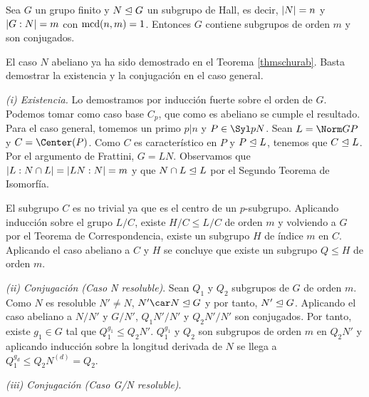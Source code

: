 
\begin{teorema} Sea $G$ un grupo finito y $N\trianglelefteq G$ un subgrupo de Hall, es decir, $\vert N\vert=n$ y $\vert G:N\vert=m$ con $\mathop{\rm mcd}\nolimits(n,m)=1$. Entonces $G$ contiene subgrupos de orden $m$ y son conjugados. %
	\begin{demostracion}
		El caso $N$ abeliano ya ha sido demostrado en el Teorema \ref{thmschurab}. Basta demostrar la existencia y la conjugación en el caso general.
		
		\textit{(i) Existencia.} Lo demostramos por inducción fuerte sobre el orden de $G$. 
		Podemos tomar como caso base $C_p$, que como es abeliano se cumple el resultado. 
		Para el caso general, tomemos un primo $p \big| n$ y $P\in \Syl p N$. Sean $L=\Norm G P$ y $C=\Center(P)$.
		Como $C$ es característico en $P$ y $P\trianglelefteq L$, tenemos que $C\trianglelefteq L$.
		Por el argumento de Frattini, $G=LN$.
		Observamos que $\vert L:N\cap L\vert = \vert LN:N\vert = m$ y que $N\cap L \trianglelefteq L$ por el Segundo Teorema de Isomorfía.
		
		El subgrupo $C$ es no trivial ya que es el centro de un $p$-subgrupo. Aplicando inducción sobre el grupo $L/C$, existe $H/C\leq L/C$ de orden $m$ y volviendo a $G$ por el Teorema de Correspondencia, existe un subgrupo $H$ de índice $m$ en $C$. Aplicando el caso abeliano a $C$ y $H$ se concluye que existe un subgrupo $Q\leq H$ de orden $m$.
%				
%				
%				
%	
		
		\textit{(ii) Conjugación (Caso N resoluble)}. Sean $Q_1$ y $Q_2$ subgrupos de $G$ de orden $m$. Como $N$ es resoluble $N'\neq N$, $N'\car N\norm G$ y por tanto, $N'\trianglelefteq G$. Aplicando el caso abeliano a $N/N'$ y $G/N'$, $Q_1N'/N'$ y $Q_2N'/N'$ son conjugados. Por tanto, existe $g_1\in G$ tal que $Q_1^{g_1} \leq Q_2 N'$. %
		$Q_1^{g_1}$ y $Q_2$ son subgrupos de orden $m$ en $Q_2N'$ y aplicando inducción sobre la longitud derivada de $N$ se llega a $Q_1^{g_d}\leq Q_2N^{(d)} = Q_2$.
		
		\textit{(iii) Conjugación (Caso G/N resoluble)}.
	\end{demostracion}
\end{teorema}